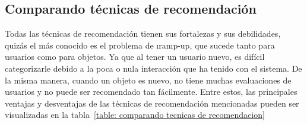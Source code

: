  	\subsection{Comparando técnicas de recomendación}
 		Todas las técnicas de recomendación tienen sus fortalezas y sus debilidades, quizás el más conocido es el problema de \i{ramp-up}, que sucede tanto para usuarios como para objetos. Ya que al tener un usuario nuevo, es difícil categorizarle debido a la poca o nula interacción que ha tenido con el sistema. De la misma manera, cuando un objeto es nuevo, no tiene muchas evaluaciones de usuarios y no puede ser recomendado tan fácilmente. Entre estos, las principales ventajas y desventajas de las técnicas de recomendación mencionadas pueden ser visualizadas en la tabla~\ref{table: comparando tecnicas de recomendacion}\cite{5}
 		
